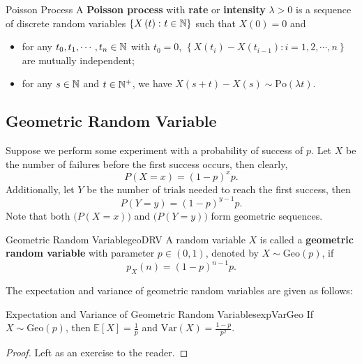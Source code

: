 \documentclass[math]{amznotes}
\theoremstyle{remark}
\newcommand{\0}{\mathbf{0}}
\newcommand{\1}{\mathbf{1}}
\begin{document}
\begin{dfnbox}{Poisson Process}
    A {\color{red} \textbf{Poisson process}} with {\color{red} \textbf{rate}} or {\color{red} \textbf{intensity}} $\lambda > 0$ is a sequence of discrete random variables $\left\{X\left(t\right) \colon t \in \mathbb{N}\right\}$ such that $X\left(0\right) = 0$ and
    \begin{itemize}
        \item for any $t_0, t_1, \cdots, t_n \in \mathbb{N}$ with $t_0 = 0$, $\left\{X\left(t_i\right) - X\left(t_{i - 1}\right) \colon i = 1, 2, \cdots, n\right\}$ are mutually independent;
        \item for any $s \in \mathbb{N}$ and $t \in \mathbb{N}^+$, we have $X\left(s + t\right) - X\left(s\right) \sim \mathrm{Po}\left(\lambda t\right)$.
    \end{itemize}
\end{dfnbox}

\subsection{Geometric Random Variable}
Suppose we perform some experiment with a probability of success of $p$. Let $X$ be the number of failures before the first success occurs, then clearly,
\begin{equation*}
    P(X = x) = (1 - p)^xp.
\end{equation*}
Additionally, let $Y$ be the number of trials needed to reach the first success, then
\begin{equation*}
    P(Y = y) = (1 - p)^{y - 1}p.
\end{equation*}
Note that both $\bigl(P(X = x)\bigr)$ and $\bigl(P(Y = y)\bigr)$ form geometric sequences.
\begin{dfnbox}{Geometric Random Variable}{geoDRV}
    A random variable $X$ is called a {\color{red} \textbf{geometric random variable}} with parameter $p \in (0, 1)$, denoted by $X \sim \mathrm{Geo}(p)$, if
    \begin{equation*}
        p_X(n) = (1 - p)^{n - 1}p.
    \end{equation*}
\end{dfnbox}
The expectation and variance of geometric random variables are given as follows:
\begin{probox}{Expectation and Variance of Geometric Random Variables}{expVarGeo}
    If $X \sim \mathrm{Geo}(p)$, then $\mathbb{E}[X] = \frac{1}{p}$ and $\mathrm{Var}(X) = \frac{1 - p}{p^2}$.
    \tcblower
    \begin{proof}
        Left as an exercise to the reader.
    \end{proof}
\end{probox}
\end{document}
